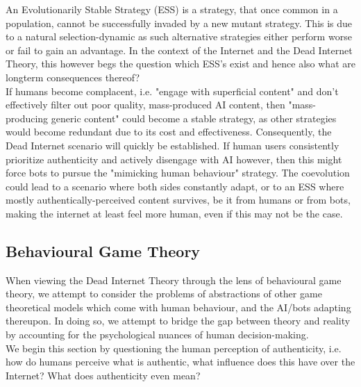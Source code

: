 \documentclass{article}
\begin{document}
An Evolutionarily Stable Strategy (ESS) is a strategy, that once common in a population, cannot be successfully invaded by a new mutant strategy. This is due to a natural selection-dynamic as such alternative strategies either perform worse or fail to gain an advantage. In the context of the Internet and the Dead Internet Theory, this however begs the question which ESS's exist and hence also what are longterm consequences thereof? \\
If humans become complacent, i.e. "engage with superficial content" and don't effectively filter out poor quality, mass-produced AI content, then "mass-producing generic content" could become a stable strategy, as other strategies would become redundant due to its cost and effectiveness. Consequently, the Dead Internet scenario will quickly be established.
If human users consistently prioritize authenticity and actively disengage with AI however, then this might force bots to pursue the "mimicking human behaviour" strategy. The coevolution could lead to a scenario where both sides constantly adapt, or to an ESS where mostly authentically-perceived content survives, be it from humans or from bots, making the internet at least feel more human, even if this may not be the case.



\subsection{Behavioural Game Theory}

 When viewing the Dead Internet Theory through the lens of behavioural game theory, we attempt to consider the problems of abstractions of other game theoretical models which come with human behaviour, and the AI/bots adapting thereupon. In doing so, we attempt to bridge the gap between theory and reality by accounting for the psychological nuances of human decision-making. \\

We begin this section by questioning the human perception of authenticity, i.e. how do humans perceive what is authentic, what influence does this have over the Internet? What does authenticity even mean? \\
\end{document}

